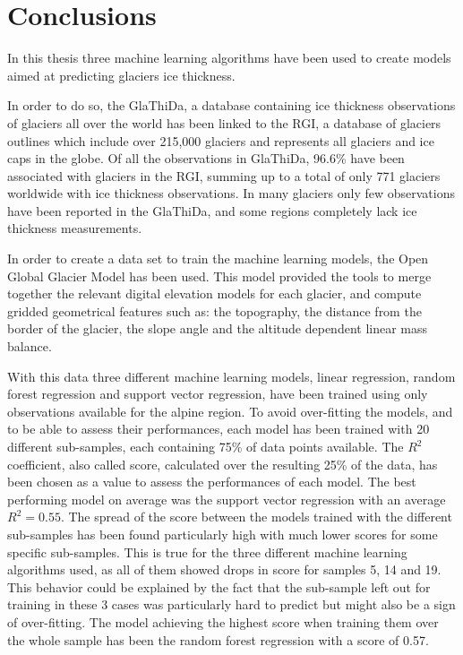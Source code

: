 \chapter{Conclusions}\label{concl}
\thispagestyle{plain}

In this thesis three machine learning algorithms have been used to create models aimed at predicting glaciers ice thickness.

In order to do so, the GlaThiDa, a database containing ice thickness observations of glaciers all over the world has been linked to the RGI, a database of glaciers outlines which include over 215,000 glaciers and represents all glaciers and ice caps in the globe. Of all the observations in GlaThiDa, 96.6\% have been associated with glaciers in the RGI, summing up to a total of only 771 glaciers worldwide with ice thickness observations. In many glaciers only few observations have been reported in the GlaThiDa, and some regions completely lack ice thickness measurements.

In order to create a data set to train the machine learning models, the Open Global Glacier Model has been used. This model provided the tools to merge together the relevant digital elevation models for each glacier, and compute gridded geometrical features such as: the topography, the distance from the border of the glacier, the slope angle and the altitude dependent linear mass balance.

With this data three different machine learning models, linear regression, random forest regression and support vector regression, have been trained using only observations available for the alpine region. To avoid over-fitting the models, and to be able to assess their performances, each model has been trained with 20 different sub-samples, each containing 75\% of data points available. The $R^2$ coefficient, also called score, calculated over the resulting 25\% of the data, has been chosen as a value to assess the performances of each model. The best performing model on average was the support vector regression with an average $R^2 = 0.55$. The spread of the score between the models trained with the different sub-samples has been found particularly high with much lower scores for some specific sub-samples. This is true for the three different machine learning algorithms used, as all of them showed drops in score for samples 5, 14 and 19. This behavior could be explained by the fact that the sub-sample left out for training in these 3 cases was particularly hard to predict but might also be a sign of over-fitting.
The model achieving the highest score when training them over the whole sample has been the random forest regression with a score of 0.57.

